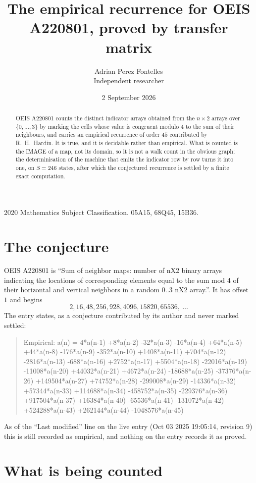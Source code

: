 \documentclass[11pt,a4paper]{article}
\title{The empirical recurrence for OEIS A220801, proved by transfer matrix}
\author{Adrian Perez Fontelles\\ \small Independent researcher}
\date{2 September 2026}
\theoremstyle{plain}
\theoremstyle{definition}
\begin{document}
\maketitle

\begin{abstract}
OEIS A220801 counts the distinct indicator arrays obtained from the $n\times2$ arrays over
$\{0,\dots,3\}$ by marking the cells whose value is congruent modulo 4 to the sum of their neighbours, and carries an
empirical recurrence of order $45$ contributed by R.~H.~Hardin. It is true, and it is
decidable rather than empirical. What is counted is the IMAGE of a map, not its domain, so it
is not a walk count in the obvious graph; the determinisation of the machine that emits the
indicator row by row turns it into one, on $S=246$ states, after which the conjectured
recurrence is settled by a finite exact computation.
\end{abstract}

\noindent\small 2020 Mathematics Subject Classification. 05A15, 68Q45, 15B36.\normalsize

\section{The conjecture}

OEIS A220801 is ``Sum of neighbor maps: number of nX2 binary arrays indicating the locations of corresponding elements equal to the sum mod 4 of their horizontal and vertical neighbors in a random 0..3 nX2 array.''. It has offset $1$ and begins
\[
2, 16, 48, 256, 928, 4096, 15820, 65536,\ \dots
\]
The entry states, as a conjecture contributed by its author and never marked settled:
\begin{quote}
Empirical: a(n) = 4*a(n-1) +8*a(n-2) -32*a(n-3) -16*a(n-4) +64*a(n-5) +44*a(n-8) -176*a(n-9) -352*a(n-10) +1408*a(n-11) +704*a(n-12) -2816*a(n-13) -688*a(n-16) +2752*a(n-17) +5504*a(n-18) -22016*a(n-19) -11008*a(n-20) +44032*a(n-21) +4672*a(n-24) -18688*a(n-25) -37376*a(n-26) +149504*a(n-27) +74752*a(n-28) -299008*a(n-29) -14336*a(n-32) +57344*a(n-33) +114688*a(n-34) -458752*a(n-35) -229376*a(n-36) +917504*a(n-37) +16384*a(n-40) -65536*a(n-41) -131072*a(n-42) +524288*a(n-43) +262144*a(n-44) -1048576*a(n-45)
\end{quote}
As of the ``Last modified'' line on the live entry (Oct 03 2025 19:05:14, revision 9) this is still
recorded as empirical, and nothing on the entry records it as proved.

\section{What is being counted}
\end{document}
